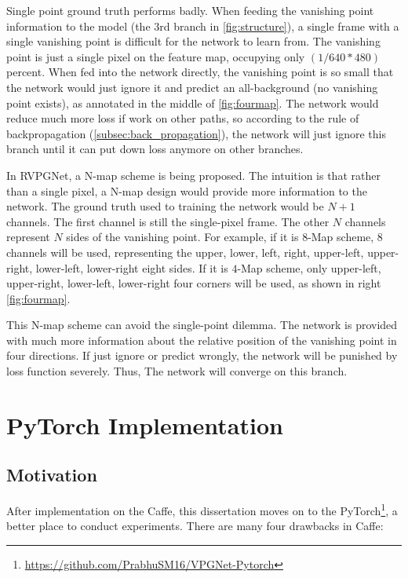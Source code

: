 \begin{spacing}{1.5}
Single point ground truth performs badly. When feeding the vanishing point information to the model (the  $3$rd branch in \autoref{fig:structure}), a single frame with a single vanishing point is difficult for the network to learn from. The vanishing point is just a single pixel on the feature map, occupying only $({1}/{640*480})$ percent. When fed into the network directly, the vanishing point is so small that the network would just ignore it and predict an all-background (no vanishing point exists), as annotated in the middle of \autoref{fig:fourmap}. The network would reduce much more loss if work on other paths, so according to the rule of backpropagation (\autoref{subsec:back_propagation}), the network will just ignore this branch until it can put down loss anymore on other branches.

In RVPGNet, a N-map scheme is being proposed. The intuition is that rather than a single pixel, a N-map design would provide more information to the network. The ground truth used to training the network would be $N+1$ channels. The first channel is still the single-pixel frame. The other $N$ channels represent $N$ sides of the vanishing point. For example, if it is $8$-Map scheme, $8$ channels will be used, representing the upper, lower, left, right, upper-left, upper-right, lower-left, lower-right eight sides. If it is $4$-Map scheme, only upper-left, upper-right, lower-left, lower-right four corners will be used, as shown in right \autoref{fig:fourmap}.

This N-map scheme can avoid the single-point dilemma. The network is provided with much more information about the relative position of the vanishing point in four directions. If just ignore or predict wrongly, the network will be punished by loss function severely. Thus, The network will converge on this branch.

\section{PyTorch Implementation}
\label{sec:MD_PyTorch}

\subsection{Motivation}

After implementation on the Caffe, this dissertation moves on to the PyTorch\footnote{\raggedright \url{https://github.com/PrabhuSM16/VPGNet-Pytorch}}, a better place to conduct experiments. There are many four drawbacks in Caffe: 


\end{spacing}
